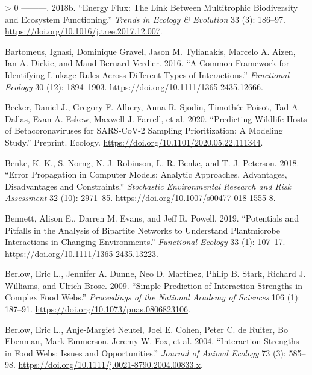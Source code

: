 \documentclass[11pt]{article}
\newlength{\cslhangindent}
\newenvironment{CSLReferences}[3] %
 {%
  \setlength{\parindent}{0pt}
  \ifodd #1 \everypar{\setlength{\hangindent}{\cslhangindent}}\ignorespaces\fi
  \ifnum #2 > 0
  \setlength{\parskip}{#2\baselineskip}
  \fi
 }%
 {}
\begin{document}
\begin{CSLReferences}{1}{0}
\leavevmode\hypertarget{ref-Barnes2018EneFlua}{}%
---------. 2018b. {``Energy Flux: The Link Between Multitrophic
Biodiversity and Ecosystem Functioning.''} \emph{Trends in Ecology \&
Evolution} 33 (3): 186--97.
\url{https://doi.org/10.1016/j.tree.2017.12.007}.

\leavevmode\hypertarget{ref-Bartomeus2016ComFra}{}%
Bartomeus, Ignasi, Dominique Gravel, Jason M. Tylianakis, Marcelo A.
Aizen, Ian A. Dickie, and Maud Bernard-Verdier. 2016. {``A Common
Framework for Identifying Linkage Rules Across Different Types of
Interactions.''} \emph{Functional Ecology} 30 (12): 1894--1903.
\url{https://doi.org/10.1111/1365-2435.12666}.

\leavevmode\hypertarget{ref-Becker2020PreWil}{}%
Becker, Daniel J., Gregory F. Albery, Anna R. Sjodin, Timothée Poisot,
Tad A. Dallas, Evan A. Eskew, Maxwell J. Farrell, et al. 2020.
{``Predicting Wildlife Hosts of Betacoronaviruses for SARS-CoV-2
Sampling Prioritization: A Modeling Study.''} Preprint. Ecology.
\url{https://doi.org/10.1101/2020.05.22.111344}.

\leavevmode\hypertarget{ref-Benke2018ErrPro}{}%
Benke, K. K., S. Norng, N. J. Robinson, L. R. Benke, and T. J. Peterson.
2018. {``Error Propagation in Computer Models: Analytic Approaches,
Advantages, Disadvantages and Constraints.''} \emph{Stochastic
Environmental Research and Risk Assessment} 32 (10): 2971--85.
\url{https://doi.org/10.1007/s00477-018-1555-8}.

\leavevmode\hypertarget{ref-Bennett2019PotPit}{}%
Bennett, Alison E., Darren M. Evans, and Jeff R. Powell. 2019.
{``Potentials and Pitfalls in the Analysis of Bipartite Networks to
Understand Plantmicrobe Interactions in Changing Environments.''}
\emph{Functional Ecology} 33 (1): 107--17.
\url{https://doi.org/10.1111/1365-2435.13223}.

\leavevmode\hypertarget{ref-Berlow2009SimPre}{}%
Berlow, Eric L., Jennifer A. Dunne, Neo D. Martinez, Philip B. Stark,
Richard J. Williams, and Ulrich Brose. 2009. {``Simple Prediction of
Interaction Strengths in Complex Food Webs.''} \emph{Proceedings of the
National Academy of Sciences} 106 (1): 187--91.
\url{https://doi.org/10.1073/pnas.0806823106}.

\leavevmode\hypertarget{ref-Berlow2004IntStr}{}%
Berlow, Eric L., Anje-Margiet Neutel, Joel E. Cohen, Peter C. de Ruiter,
Bo Ebenman, Mark Emmerson, Jeremy W. Fox, et al. 2004. {``Interaction
Strengths in Food Webs: Issues and Opportunities.''} \emph{Journal of
Animal Ecology} 73 (3): 585--98.
\url{https://doi.org/10.1111/j.0021-8790.2004.00833.x}.


\end{CSLReferences}
\end{document}
